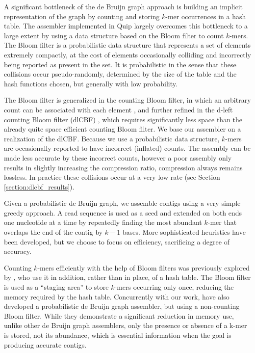 \documentclass[a4,center,fleqn]{NAR}
\begin{document}
A significant bottleneck of the de Bruijn graph approach is building an
implicit representation of the graph by counting and storing $k$-mer
occurrences in a hash table. The assembler implemented in Quip largely
overcomes this bottleneck to a large extent by using a data structure based on
the Bloom filter to count $k$-mers. The Bloom filter \citep{Bloom1970} is a
probabilistic data structure that represents a set of elements extremely
compactly, at the cost of elements occasionally colliding and incorrectly
being reported as present in the set. It is probabilistic in the sense that
these collisions occur pseudo-randomly, determined by the size of the table
and the hash functions chosen, but generally with low probability.

The Bloom filter is generalized in the counting Bloom filter, in which an
arbitrary count can be associated with each element \citep{Fan2000}, and
further refined in the d-left counting Bloom filter (dlCBF)
\citep{Bonomi2006}, which requires significantly less space than the already
quite space efficient counting Bloom filter. We base our assembler on a
realization of the dlCBF. Because we use a probabilistic data structure,
$k$-mers are occasionally reported to have incorrect (inflated) counts. The
assembly can be made less accurate by these incorrect counts, however a poor
assembly only results in slightly increasing the compression ratio,
compression always remains lossless. In practice these collisions occur
at a very low rate (see Section \ref{section:dlcbf_results}).

Given a probabilistic de Bruijn graph, we assemble contigs using a very simple
greedy approach. A read sequence is used as a seed and extended on both ends
one nucleotide at a time by repeatedly finding the most abundant $k$-mer that
overlaps the end of the contig by $k-1$ bases. More sophisticated heuristics
have been developed, but we choose to focus on efficiency, sacrificing a
degree of accuracy.

Counting $k$-mers efficiently with the help of Bloom filters was previously
explored by \citet{Melsted2011}, who use it in addition, rather than
in place, of a hash table. The Bloom filter is used as a ``staging area'' to
store $k$-mers occurring only once, reducing the memory required by the hash
table. Concurrently with our work, \citet{Pell2011} have also developed a
probabilistic de Bruijn graph assembler, but using a non-counting Bloom
filter. While they demonstrate a significant reduction in memory use, unlike
other de Bruijn graph assemblers, only the presence or absence of a k-mer is
stored, not its abundance, which is essential information when the goal is
producing accurate contigs.
\end{document}
